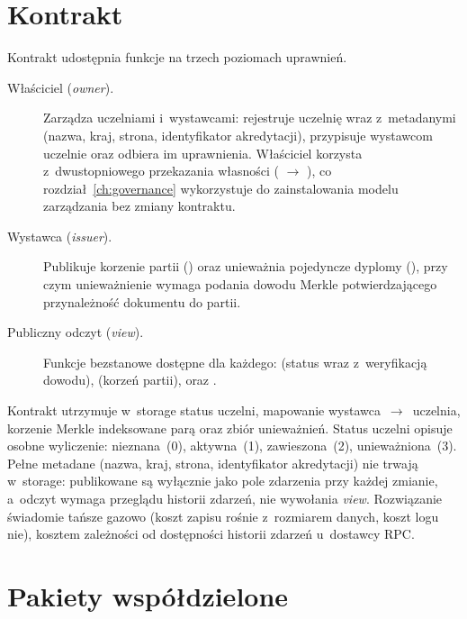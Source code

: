 \section{Kontrakt }
\label{sec:kontrakt}

Kontrakt  udostępnia funkcje na trzech poziomach uprawnień.

\begin{description}
  \item[Właściciel (\emph{owner}).] Zarządza uczelniami i~wystawcami: rejestruje
        uczelnię wraz z~metadanymi (nazwa, kraj, strona, identyfikator
        akredytacji), przypisuje wystawcom uczelnie oraz odbiera im uprawnienia.
        Właściciel korzysta z~dwustopniowego przekazania własności
        ( $\rightarrow$ ), co
        rozdział~\ref{ch:governance} wykorzystuje do zainstalowania modelu
        zarządzania bez zmiany kontraktu.
  \item[Wystawca (\emph{issuer}).] Publikuje korzenie partii
        () oraz unieważnia pojedyncze dyplomy
        (), przy czym unieważnienie wymaga podania dowodu
        Merkle potwierdzającego przynależność dokumentu do partii.
  \item[Publiczny odczyt (\emph{view}).] Funkcje bezstanowe dostępne dla każdego:
         (status wraz z~weryfikacją dowodu), 
        (korzeń partii),  oraz .
\end{description}

Kontrakt utrzymuje w~storage status uczelni, mapowanie wystawca~$\rightarrow$~uczelnia,
korzenie Merkle indeksowane parą  oraz zbiór unieważnień.
Status uczelni opisuje osobne wyliczenie: nieznana~(0), aktywna~(1),
zawieszona~(2), unieważniona~(3). Pełne metadane (nazwa, kraj, strona,
identyfikator akredytacji) nie trwają w~storage: publikowane są wyłącznie
jako pole zdarzenia  przy każdej zmianie, a~odczyt wymaga
przeglądu historii zdarzeń, nie wywołania \emph{view}. Rozwiązanie świadomie
tańsze gazowo (koszt zapisu  rośnie z~rozmiarem danych, koszt
logu nie), kosztem zależności od dostępności historii zdarzeń u~dostawcy
RPC.

\section{Pakiety współdzielone}
\label{sec:pakiety}

